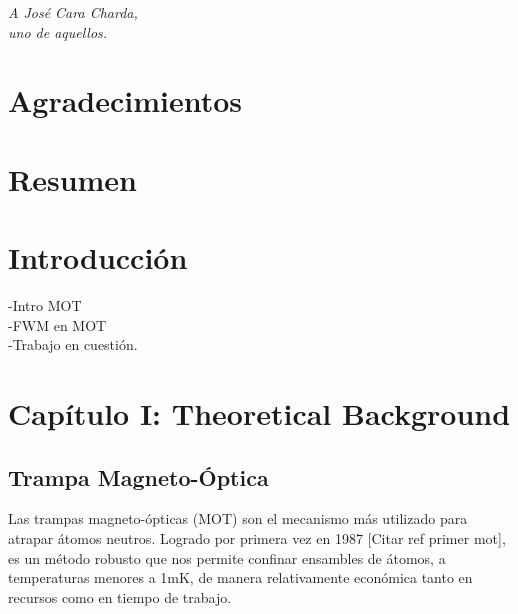 \documentclass[12pt,twoside]{article}
\begin{document}
\vspace{2cm}
\normalsize

\begin{flushright}
\textit{A José Cara Charda,}\\
\textit{uno de aquellos.}
\end{flushright}

\clearpage

\section*{Agradecimientos}

\clearpage

\section*{Resumen}



\clearpage


\tableofcontents
\clearpage





\section{Introducción}\label{introduccion}

-Intro MOT \\
-FWM en MOT\\
-Trabajo en cuestión.\\


\section{Capítulo I: Theoretical Background}\label{problema}


\subsection{Trampa Magneto-Óptica}\label{MOT}

Las trampas magneto-ópticas (MOT) son el mecanismo más utilizado para atrapar átomos neutros. Logrado por primera vez en 1987 [Citar ref primer mot], es un método robusto que nos permite confinar ensambles de átomos, a temperaturas menores a 1mK, de manera relativamente económica tanto en recursos como en tiempo de trabajo.\\ 
\end{document}
